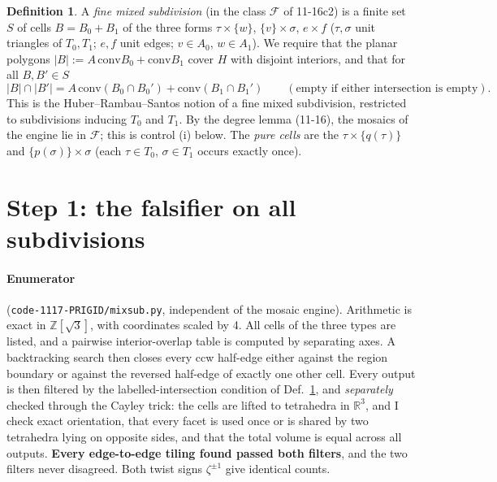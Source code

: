 \documentclass[11pt]{article}
\theoremstyle{definition}
\newtheorem{definition}[theorem]{Definition}
\begin{document}
\begin{definition}\label{def:fms}
A \emph{fine mixed subdivision} (in the class $\mathcal F$ of 11-16c2) is a finite set $S$ of cells $B=B_0+B_1$ of the three forms
$\tau\times\{w\}$, $\{v\}\times\sigma$, $e\times f$ ($\tau,\sigma$ unit triangles of $T_0,T_1$; $e,f$ unit edges; $v\in A_0$, $w\in A_1$).
We require that the planar polygons $|B|:=A\,\mathrm{conv}B_0+\mathrm{conv}B_1$ cover $H$ with disjoint interiors, and that for all $B,B'\in S$
\[|B|\cap|B'|=A\,\mathrm{conv}(B_0\cap B_0')+\mathrm{conv}(B_1\cap B_1')\qquad(\text{empty if either intersection is empty}).\]
This is the Huber--Rambau--Santos notion of a fine mixed subdivision, restricted to subdivisions inducing $T_0$ and $T_1$. By the degree lemma (11-16), the mosaics of the engine lie in $\mathcal F$; this is control (i) below.
The \emph{pure cells} are the $\tau\times\{q(\tau)\}$ and $\{p(\sigma)\}\times\sigma$ (each $\tau\in T_0$, $\sigma\in T_1$ occurs exactly once).
\end{definition}

\section{Step 1: the falsifier on all subdivisions}
\paragraph{Enumerator} (\texttt{code-1117-PRIGID/mixsub.py}, independent of the mosaic engine). Arithmetic is exact in $\mathbb Z[\sqrt3]$, with coordinates scaled
by 4. All cells of the three types are listed, and a pairwise interior-overlap table is computed by separating axes. A backtracking search then closes every ccw half-edge
either against the region boundary or against the reversed half-edge of exactly one other cell. Every output is then filtered by the labelled-intersection condition of
Def.~\ref{def:fms}, and \emph{separately} checked through the Cayley trick: the cells are lifted to tetrahedra in $\mathbb R^3$, and I check exact orientation, that every
facet is used once or is shared by two tetrahedra lying on opposite sides, and that the total volume is equal across all outputs.
\textbf{Every edge-to-edge tiling found passed both filters}, and the two filters never disagreed. Both twist signs $\zeta^{\pm1}$ give identical counts.
\end{document}
